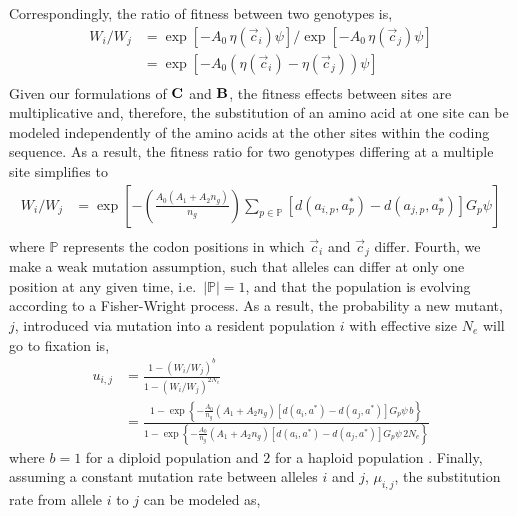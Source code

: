 \documentclass[12pt,letterpaper,fleqn]{article}
\newcommand{\Cost}{\ensuremath{\text{\textbf{C}}}\xspace}
\newcommand{\Func}{\ensuremath{\text{\textbf{B}}}\xspace}
\newcommand{\Ne}{\ensuremath{{N_e}}\xspace} %
\newcommand{\aip}{\ensuremath{a_{i,p}}\xspace}
\newcommand{\ajp}{\ensuremath{a_{j,p}}\xspace}
\newcommand{\aopt}{\ensuremath{a^*}\xspace}
\newcommand{\aoptp}{\ensuremath{a^*_p}\xspace}
\newcommand{\cveci}{\ensuremath{\cvec_i}\xspace}
\newcommand{\cvecj}{\ensuremath{\cvec_j}\xspace}
\newcommand{\cvec}{\ensuremath{\Vec{c}}\xspace}
\newcommand{\muij}{\ensuremath{\mu_{i,j}}\xspace}
\newcommand{\setP}{\ensuremath{\mathbb{P}}\xspace}
\renewcommand{\ng}{\ensuremath{{n_g}}\xspace}
\begin{document}
Correspondingly, the ratio of fitness between two genotypes is,
\begin{align}
  W_i/W_j &=  \exp\left[- A_0 \, \eta(\cveci) \psi\right]/\exp\left[- A_0 \, \eta(\cvecj) \psi\right]\\
  &=  \exp\left[- A_0 \left(\eta(\cveci)- \eta(\cvecj)\right) \psi\right] \label{eq:Wratio}\\
\end{align}
Given our formulations of \Cost and \Func, the fitness effects between sites are multiplicative and, therefore, the substitution of an amino acid at one site can be modeled independently of the amino acids at the other sites within the coding sequence.
As a result, the fitness ratio for two genotypes differing at a multiple site simplifies to
\begin{align*}
  W_i/W_j  &= \exp\left[- \left(\frac{A_0 \left(A_1 + A_2 \ng\right)}{\ng}\right)\sum_{p \in \setP} \left[d\left(\aip,\aoptp\right) - d\left(\ajp,\aoptp\right)\right] G_p \psi \right]\\
\end{align*}
where \setP represents the codon positions in which \cveci and \cvecj differ.
Fourth, we make a weak mutation assumption, such that alleles can differ at only one position at any given time, i.e.~$|\setP| = 1$, and that the population is evolving according to a Fisher-Wright process.
As a result, the probability a new mutant, $j$, introduced via mutation into a resident population $i$ with effective size \Ne will go to fixation is,
\begin{align*}
  u_{i,j} &=  \frac{1 - \left(W_i/W_j\right)^b}{1 - \left(W_i/W_j\right)^{2 \Ne}}\\
   &= \frac{1- \exp\left\{- \frac{A_0}{\ng} \left(A_1 + A_2 \ng\right) \left[d\left(a_i,\aopt\right) - d\left(a_j,\aopt\right)\right] G_p \psi \,  b\right\}}  {1-\exp\left\{- \frac{A_0}{\ng} \left(A_1 + A_2 \ng\right) \left[d\left(a_i,\aopt\right) - d\left(a_j,\aopt\right)\right] G_p \psi \, 2\Ne\right\}}
\end{align*}
where $b=1$ for a diploid population and $2$ for a haploid population \citep{Kimura1962,Wright1969,Iwasa1988,BergAndLassig2003,SellaAndHirsh2005}.
Finally, assuming a constant mutation rate between alleles $i$ and $j$, $\muij$, the substitution rate from allele $i$ to $j$ can be modeled as,
\end{document}
